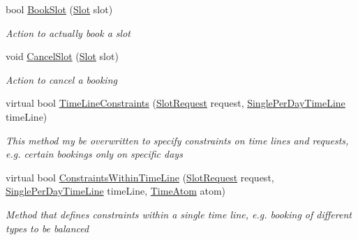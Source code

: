 \begin{DoxyCompactItemize}
bool \hyperlink{class_general_health_care_elements_1_1_booking_models_1_1_general_booking_model_a609c7585f191ef01f40a54f9837e30f3}{Book\+Slot} (\hyperlink{class_general_health_care_elements_1_1_booking_models_1_1_slot}{Slot} slot)
\begin{DoxyCompactList}\small\item\em Action to actually book a slot \end{DoxyCompactList}\item 
void \hyperlink{class_general_health_care_elements_1_1_booking_models_1_1_general_booking_model_a49154cb9a2e215eaa3e1847ee0e14c34}{Cancel\+Slot} (\hyperlink{class_general_health_care_elements_1_1_booking_models_1_1_slot}{Slot} slot)
\begin{DoxyCompactList}\small\item\em Action to cancel a booking \end{DoxyCompactList}\item 
virtual bool \hyperlink{class_general_health_care_elements_1_1_booking_models_1_1_general_booking_model_a24c00d4e9bdc2542d4e7f61ba7625281}{Time\+Line\+Constraints} (\hyperlink{class_general_health_care_elements_1_1_booking_models_1_1_slot_request}{Slot\+Request} request, \hyperlink{class_general_health_care_elements_1_1_booking_models_1_1_single_per_day_time_line}{Single\+Per\+Day\+Time\+Line} time\+Line)
\begin{DoxyCompactList}\small\item\em This method my be overwritten to specify constraints on time lines and requests, e.\+g. certain bookings only on specific days \end{DoxyCompactList}\item 
virtual bool \hyperlink{class_general_health_care_elements_1_1_booking_models_1_1_general_booking_model_ad3a5aaefdd9553ae1b446728331d4821}{Constraints\+Within\+Time\+Line} (\hyperlink{class_general_health_care_elements_1_1_booking_models_1_1_slot_request}{Slot\+Request} request, \hyperlink{class_general_health_care_elements_1_1_booking_models_1_1_single_per_day_time_line}{Single\+Per\+Day\+Time\+Line} time\+Line, \hyperlink{class_general_health_care_elements_1_1_booking_models_1_1_time_atom}{Time\+Atom} atom)
\begin{DoxyCompactList}\small\item\em Method that defines constraints within a single time line, e.\+g. booking of different types to be balanced \end{DoxyCompactList}\end{DoxyCompactItemize}
